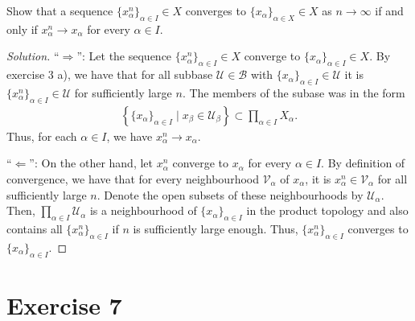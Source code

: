 \documentclass[a4paper]{article}
\theoremstyle{definition}
\begin{document}
Show that a sequence \(\{x_\alpha^n\}_{\alpha \in I} \in X\) converges to \(\{x_\alpha\}_{\alpha \in X} \in X\) as \(n \longrightarrow \infty\) if and only if \(x^n_\alpha \longrightarrow x_\alpha\) for every \(\alpha \in I\).

\begin{proof}[Solution]
    ``\(\Rightarrow\)'': Let the sequence \(\{x_\alpha^n\}_{\alpha \in I} \in X\) converge to \(\{x_\alpha\}_{\alpha \in I} \in X\). By exercise 3 a), we have that for all subbase \(\mathcal{U} \in \mathcal{B}\) with \(\{x_\alpha\}_{\alpha \in I} \in \mathcal{U}\) it is \(\{x_\alpha^n\}_{\alpha \in I} \in \mathcal{U}\) for sufficiently large \(n\). The members of the subase was in the form
    \begin{align*}
        \left\{ \{x_\alpha\}_{\alpha \in I} \mid x_\beta \in \mathcal{U}_\beta \right\} \subset \prod_{\alpha \in I} X_\alpha \text{.}
    \end{align*}
    Thus, for each \(\alpha \in I\), we have \(x^n_\alpha \rightarrow x_\alpha\).

    ``\(\Leftarrow\)'': On the other hand, let \(x^n_\alpha\) converge to \(x_\alpha\) for every \(\alpha \in I\). By definition of convergence, we have that for every neighbourhood \(\mathcal{V}_\alpha\) of \(x_\alpha\), it is \(x^n_\alpha \in \mathcal{V}_\alpha\) for all sufficiently large \(n\). Denote the open subsets of these neighbourhoods by \(\mathcal{U}_\alpha\). Then, \(\prod_{\alpha \in I} \mathcal{U}_\alpha\) is a neighbourhood of \(\{x_\alpha\}_{\alpha \in I}\) in the product topology and also contains all \(\{x_\alpha^n\}_{\alpha \in I}\) if \(n\) is sufficiently large enough. Thus, \(\{x_\alpha^n\}_{\alpha \in I}\) converges to \(\{x_\alpha\}_{\alpha \in I}\).
\end{proof}
\section*{Exercise 7}
\end{document}

